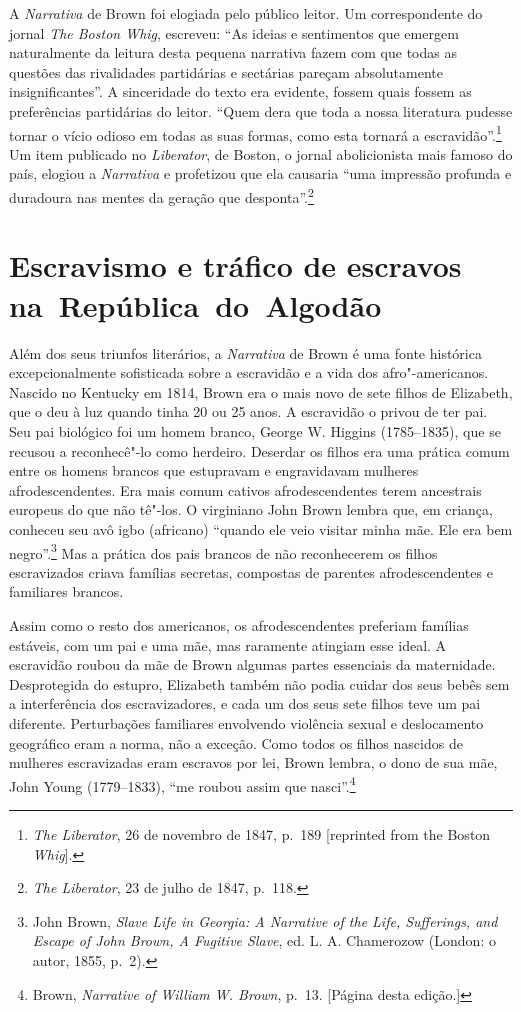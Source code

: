 A \emph{Narrativa} de Brown foi elogiada pelo público leitor. Um
correspondente do jornal \emph{The Boston Whig}, escreveu: ``As ideias e
sentimentos que emergem naturalmente da leitura desta pequena narrativa
fazem com que todas as questões das rivalidades partidárias e sectárias
pareçam absolutamente insignificantes''. A sinceridade do texto era
evidente, fossem quais fossem as preferências partidárias do leitor.
``Quem dera que toda a nossa literatura pudesse tornar o vício odioso em
todas as suas formas, como esta tornará a escravidão''.\footnote{\emph{The
  Liberator}, 26 de novembro de 1847, p.~189 {[}reprinted from the Boston
  \emph{Whig}{]}.} Um item publicado no \emph{Liberator}, de Boston, o
jornal abolicionista mais famoso do país, elogiou a \emph{Narrativa} e
profetizou que ela causaria ``uma impressão profunda e duradoura nas
mentes da geração que desponta''.\footnote{\emph{The Liberator}, 23 de
  julho de 1847, p.~118.}

\section{Escravismo e tráfico de escravos na~República~do~Algodão}

Além dos seus triunfos literários, a \emph{Narrativa} de Brown é uma
fonte histórica excepcionalmente sofisticada sobre a escravidão e a vida
dos afro"-americanos. Nascido no Kentucky em 1814, Brown era o mais novo
de sete filhos de Elizabeth, que o deu à luz quando tinha 20 ou 25 anos.
A escravidão o privou de ter pai. Seu pai biológico foi um homem branco,
George W. Higgins (1785--1835), que se recusou a reconhecê"-lo como
herdeiro. Deserdar os filhos era uma prática comum entre os homens
brancos que estupravam e engravidavam mulheres afrodescendentes. Era
mais comum cativos afrodescendentes terem ancestrais europeus do que não
tê"-los. O virginiano John Brown lembra que, em criança, conheceu seu avô
igbo (africano) ``quando ele veio visitar minha mãe. Ele era bem
negro''.\footnote{John Brown, \emph{Slave Life in Georgia: A Narrative
  of the Life, Sufferings, and Escape of John Brown, A Fugitive Slave},
  ed. L. A. Chamerozow (London: o autor, 1855, p.~2).} Mas a prática dos
pais brancos de não reconhecerem os filhos escravizados criava famílias
secretas, compostas de parentes afrodescendentes e familiares brancos.

Assim como o resto dos americanos, os afrodescendentes preferiam
famílias estáveis, com um pai e uma mãe, mas raramente atingiam esse
ideal. A escravidão roubou da mãe de Brown algumas partes essenciais da
maternidade. Desprotegida do estupro, Elizabeth também não podia cuidar
dos seus bebês sem a interferência dos escravizadores, e cada um dos
seus sete filhos teve um pai diferente. Perturbações familiares
envolvendo violência sexual e deslocamento geográfico eram a norma, não
a exceção. Como todos os filhos nascidos de mulheres escravizadas eram
escravos por lei, Brown lembra, o dono de sua mãe, John Young
(1779--1833), ``me roubou assim que nasci''.\footnote{Brown,
  \emph{Narrative of William W. Brown}, p.~13. {[}Página \pageref{ref5} desta
  edição.{]}}


